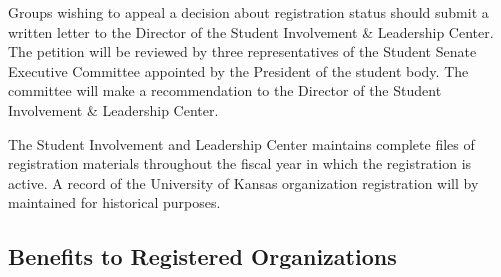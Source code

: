Groups wishing to appeal a decision about registration status should submit a written letter to the Director of the Student Involvement \& Leadership Center. The petition will be reviewed by three representatives of the Student Senate Executive Committee appointed by the President of the student body. The committee will make a recommendation to the Director of the Student Involvement \& Leadership Center.

The Student Involvement and Leadership Center maintains complete files of registration materials throughout the fiscal year in which the registration is active. A record of the University of Kansas organization registration will by maintained for historical purposes.

\subsection{Benefits to Registered Organizations}

